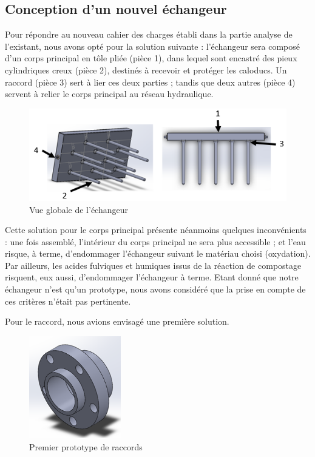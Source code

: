 \documentclass[../PS6_RapportFinal.tex]{subfiles}
\begin{document}
\graphicspath{{img/}{tex/img/}}
\subsection{Conception d'un nouvel échangeur}
\label{conceptionechangeur}

Pour répondre au nouveau cahier des charges établi dans la partie analyse de l'existant, nous avons opté pour la solution suivante : l'échangeur sera composé d'un corps principal en tôle pliée (pièce 1), dans lequel sont encastré des pieux cylindriques creux (pièce 2), destinés à recevoir et protéger les caloducs. Un raccord (pièce 3) sert à lier ces deux parties ; tandis que deux autres (pièce 4) servent à relier le corps principal au réseau hydraulique.

\begin{figure}[!h]
\begin{center}
\includegraphics[width=13cm]{3_1_Vue_globale_1_et_2_numerotees.png}
\caption{Vue globale de l'échangeur}
\end{center}
\end{figure}

Cette solution pour le corps principal présente néanmoins quelques inconvénients : une fois assemblé, l'intérieur du corps principal ne sera plus accessible ; et l'eau risque, à terme, d'endommager l'échangeur suivant le matériau choisi (oxydation). Par ailleurs, les acides fulviques et humiques issus de la réaction de compostage risquent, eux aussi, d'endommager l'échangeur à terme. Etant donné que notre échangeur n'est qu'un prototype, nous avons considéré que la prise en compte de ces critères n'était pas pertinente. 

Pour le raccord, nous avions envisagé une première solution. 

\begin{figure}[!h]
\begin{center}
\includegraphics[width=4cm]{3_1_Raccord_1.png}
\caption{Premier prototype de raccords}
\end{center}
\end{figure}
\end{document}
